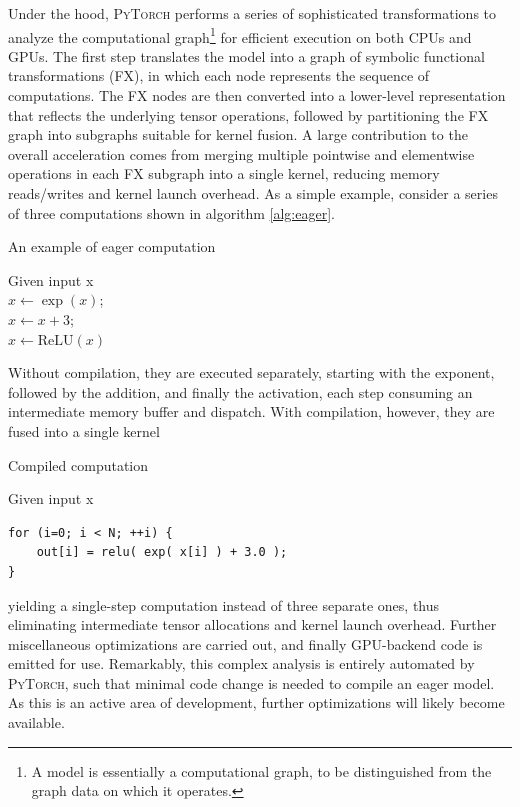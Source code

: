 Under the hood, \textsc{PyTorch} performs a series of sophisticated transformations to analyze the computational graph\footnote{A model is essentially a computational graph, to be distinguished from the graph data on which it operates.} for efficient execution on both CPUs and GPUs. 
The first step translates the model into a graph of symbolic functional transformations (FX), in which each node represents the sequence of computations.
The FX nodes are then converted into a lower-level representation that reflects the underlying tensor operations, followed by partitioning the FX graph into subgraphs suitable for kernel fusion.
A large contribution to the overall acceleration comes from merging multiple pointwise and elementwise operations in each FX subgraph into a single kernel, reducing memory reads/writes and kernel launch overhead.
As a simple example, consider a series of three computations shown in algorithm \ref{alg:eager}. 
\begin{algorithm}
\caption{An example of eager computation }\label{alg:eager}
Given input x \\
$x\gets \exp(x)$;\\
$x \gets x + 3$; \\
$x \gets \mathrm{ReLU}(x)$
\end{algorithm}
Without compilation, they are executed separately, starting with the exponent, followed by the addition, and finally the activation, each step consuming an intermediate memory buffer and dispatch. 
With compilation, however, they are fused into a single kernel
\begin{algorithm}
\caption{Compiled computation }\label{alg:compiled}
Given input x \\
\begin{verbatim}
for (i=0; i < N; ++i) {
    out[i] = relu( exp( x[i] ) + 3.0 );
}
\end{verbatim}
\end{algorithm}
yielding a single-step computation instead of three separate ones, thus eliminating intermediate tensor allocations and kernel launch overhead.
Further miscellaneous optimizations are carried out, and finally GPU-backend code is emitted for use.
Remarkably, this complex analysis is entirely automated by \textsc{PyTorch}, such that minimal code change is needed to compile an eager model. 
As this is an active area of development, further optimizations will likely become available. 


